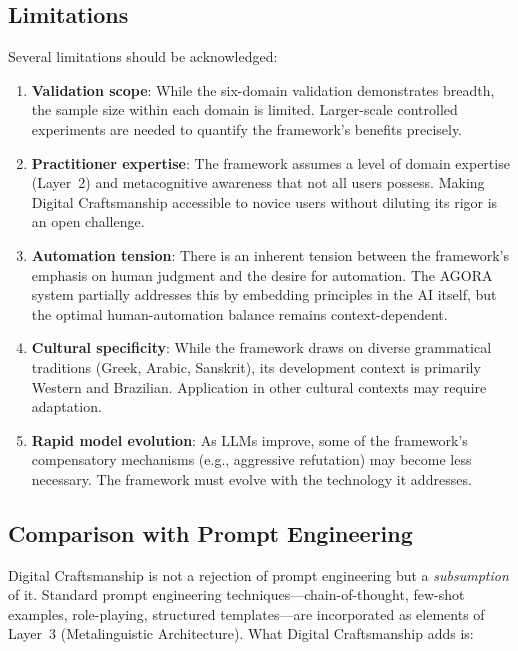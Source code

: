 \documentclass[11pt,a4paper]{article}
\begin{document}
\subsection{Limitations}

Several limitations should be acknowledged:

\begin{enumerate}
    \item \textbf{Validation scope}: While the six-domain validation demonstrates breadth, the sample size within each domain is limited. Larger-scale controlled experiments are needed to quantify the framework's benefits precisely.

    \item \textbf{Practitioner expertise}: The framework assumes a level of domain expertise (Layer~2) and metacognitive awareness that not all users possess. Making Digital Craftsmanship accessible to novice users without diluting its rigor is an open challenge.

    \item \textbf{Automation tension}: There is an inherent tension between the framework's emphasis on human judgment and the desire for automation. The AGORA system partially addresses this by embedding principles in the AI itself, but the optimal human-automation balance remains context-dependent.

    \item \textbf{Cultural specificity}: While the framework draws on diverse grammatical traditions (Greek, Arabic, Sanskrit), its development context is primarily Western and Brazilian. Application in other cultural contexts may require adaptation.

    \item \textbf{Rapid model evolution}: As LLMs improve, some of the framework's compensatory mechanisms (e.g., aggressive refutation) may become less necessary. The framework must evolve with the technology it addresses.
\end{enumerate}

\subsection{Comparison with Prompt Engineering}

Digital Craftsmanship is not a rejection of prompt engineering but a \emph{subsumption} of it. Standard prompt engineering techniques---chain-of-thought, few-shot examples, role-playing, structured templates---are incorporated as elements of Layer~3 (Metalinguistic Architecture). What Digital Craftsmanship adds is:
\end{document}
